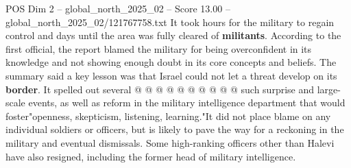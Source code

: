 \begin{textsample}{POS Dim 2 – global\_north\_2025\_02 – Score 13.00 – global\_north\_2025\_02/121767758.txt}
It took hours for the military to regain control and days until the area was fully cleared of \textbf{militants}.
According to the first official, the report blamed the military for being overconfident in its knowledge and not showing enough doubt in its core concepts and beliefs.
The summary said a key lesson was that Israel could not let a threat develop on its \textbf{border}.
It spelled out several @ @ @ @ @ @ @ @ @ @ such surprise and large-scale events, as well as reform in the military intelligence department that would foster"openness, skepticism, listening, learning."It did not place blame on any individual soldiers or officers, but is likely to pave the way for a reckoning in the military and eventual dismissals.
Some high-ranking officers other than Halevi have also resigned, including the former head of military intelligence.

\end{textsample}
